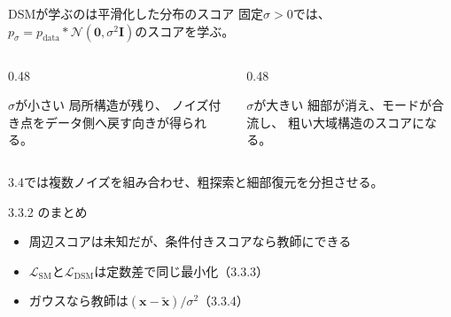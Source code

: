 \asmain
\begin{frame}{DSMが学ぶのは平滑化した分布のスコア}
    固定$\sigma>0$では、$p_{\sigma}=p_{\mathrm{data}}*\mathcal{N}(\bm{0},\sigma^{2}\bm{I})$のスコアを学ぶ。
    \begin{columns}[T,onlytextwidth]
        \begin{column}{0.48\textwidth}
            \begin{block}{$\sigma$が小さい}
                局所構造が残り、
                ノイズ付き点をデータ側へ戻す向きが得られる。
            \end{block}
        \end{column}
        \begin{column}{0.48\textwidth}
            \begin{block}{$\sigma$が大きい}
                細部が消え、モードが合流し、
                粗い大域構造のスコアになる。
            \end{block}
        \end{column}
    \end{columns}
    \vfill
    3.4では複数ノイズを組み合わせ、粗探索と細部復元を分担させる。
\end{frame}
\asmain
\begin{frame}{3.3.2 のまとめ}
    \begin{itemize}
        \item 周辺スコアは未知だが、条件付きスコアなら教師にできる
        \item $\mathcal{L}_{\mathrm{SM}}$と$\mathcal{L}_{\mathrm{DSM}}$は定数差で同じ最小化（3.3.3）
        \item ガウスなら教師は$(\bm{x}-\tilde{\bm{x}})/\sigma^{2}$（3.3.4）
    \end{itemize}
\end{frame}
